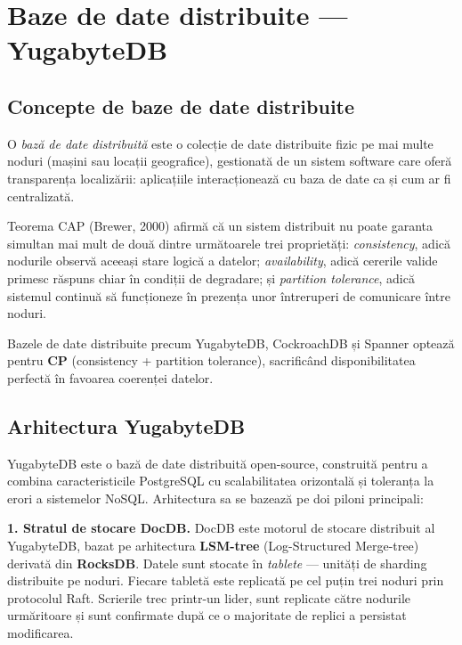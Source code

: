 \section{Baze de date distribuite — YugabyteDB}
\label{sec:yugabytedb}

\subsection{Concepte de baze de date distribuite}
\label{subsec:baze_distribuite}

O \emph{bază de date distribuită} este o colecție de date distribuite fizic
pe mai multe noduri (mașini sau locații geografice), gestionată de un sistem
software care oferă transparența localizării: aplicațiile interacționează cu
baza de date ca și cum ar fi centralizată.

\begin{definitie}
\label{def:cap}
Teorema CAP (Brewer, 2000) afirmă că un sistem distribuit nu poate garanta
simultan mai mult de două dintre următoarele trei proprietăți:
\emph{consistency}, adică nodurile observă aceeași stare logică a datelor;
\emph{availability}, adică cererile valide primesc răspuns chiar în condiții
de degradare; și \emph{partition tolerance}, adică sistemul continuă să funcționeze
în prezența unor întreruperi de comunicare între noduri.
\end{definitie}

Bazele de date distribuite precum YugabyteDB, CockroachDB și Spanner optează
pentru \textbf{CP} (consistency + partition tolerance), sacrificând disponibilitatea
perfectă în favoarea coerenței datelor.

\subsection{Arhitectura YugabyteDB}
\label{subsec:yugabyte_arhitectura}

YugabyteDB \cite{yugabyte2024} este o bază de date distribuită open-source,
construită pentru a combina caracteristicile PostgreSQL cu scalabilitatea
orizontală și toleranța la erori a sistemelor NoSQL. Arhitectura sa se bazează
pe doi piloni principali:

\textbf{1. Stratul de stocare DocDB.} DocDB este motorul de stocare
distribuit al YugabyteDB, bazat pe arhitectura \textbf{LSM-tree} (Log-Structured
Merge-tree) derivată din \textbf{RocksDB}. Datele sunt stocate în \emph{tablete}
--- unități de sharding distribuite pe noduri. Fiecare tabletă este replicată
pe cel puțin trei noduri prin protocolul Raft. Scrierile trec printr-un lider,
sunt replicate către nodurile urmăritoare și sunt confirmate după ce o majoritate
de replici a persistat modificarea.

